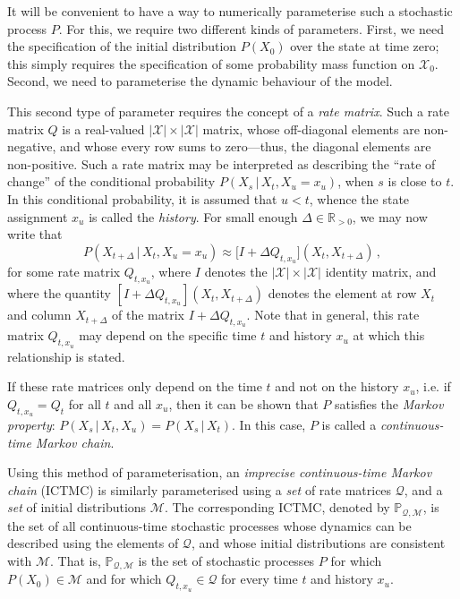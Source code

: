\documentclass[twoside,11pt]{article}
\newcommand{\reals}{\mathbb{R}}
\newcommand{\realspos}{\reals_{>0}}
\newcommand{\states}{\mathcal{X}}
\newcommand{\rateset}{\mathcal{Q}}
\begin{document}
It will be convenient to have a way to numerically parameterise such a stochastic process $P$. For this, we require two different kinds of parameters. First, we need the specification of the initial distribution $P(X_0)$ over the state at time zero; this simply requires the specification of some probability mass function on $\states_0$. Second, we need to parameterise the dynamic behaviour of the model.

This second type of parameter requires the concept of a \emph{rate matrix}. Such a rate matrix $Q$ is a real-valued $\lvert\states\rvert\times\lvert\states\rvert$ matrix, whose off-diagonal elements are non-negative, and whose every row sums to zero---thus, the diagonal elements are non-positive. Such a rate matrix may be interpreted as describing the ``rate of change'' of the conditional probability $P(X_s\,\vert\,X_t,X_u=x_u)$, when $s$ is close to $t$. In this conditional probability, it is assumed that $u<t$, whence the state assignment $x_u$ is called the \emph{history}. For small enough $\Delta\in\realspos$, we may now write that
\begin{equation*}
P(X_{t+\Delta}\,\vert\,X_t,X_u=x_u) \approx \bigl[I + \Delta Q_{t,x_u}\bigr](X_t, X_{t+\Delta})\,,
\end{equation*}
for some rate matrix $Q_{t,x_u}$, where $I$ denotes the $\lvert\states\rvert\times\lvert\states\rvert$ identity matrix, and where the quantity $[I + \Delta Q_{t,x_u}](X_t,X_{t+\Delta})$ denotes the element at row $X_t$ and column $X_{t+\Delta}$ of the matrix $I + \Delta Q_{t,x_u}$. Note that in general, this rate matrix $Q_{t,x_u}$ may depend on the specific time $t$ and history $x_u$ at which this relationship is stated. %

If these rate matrices only depend on the time $t$ and not on the history $x_u$, i.e. if $Q_{t,x_u}=Q_t$ for all $t$ and all $x_u$, then it can be shown that $P$ satisfies the \emph{Markov property}: $P(X_s\,\vert\,X_t,X_u)=P(X_s\,\vert\,X_t)$. In this case, $P$ is called a \emph{continuous-time Markov chain}.

Using this method of parameterisation, an \emph{imprecise continuous-time Markov chain} (ICTMC) is similarly parameterised using a \emph{set} of rate matrices $\rateset$, and a \emph{set} of initial distributions $\mathcal{M}$. The corresponding ICTMC, denoted by $\mathbb{P}_{\rateset,\mathcal{M}}$, is the set of all continuous-time stochastic processes whose dynamics can be described using the elements of $\rateset$, and whose initial distributions are consistent with $\mathcal{M}$. That is, $\mathbb{P}_{\rateset,\mathcal{M}}$ is the set of stochastic processes $P$ for which $P(X_0)\in\mathcal{M}$ and for which $Q_{t,x_u}\in\rateset$ for every time $t$ and history $x_u$.
\end{document}
